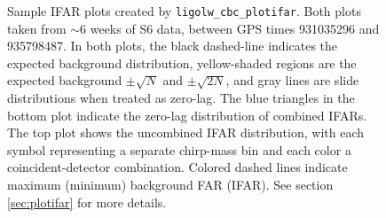 \begin{figure}[p]
\center
{}
\label{fig:sample_plotifar}
\caption{ Sample IFAR plots created by \texttt{ligolw\_cbc\_plotifar}. Both
plots taken from $\sim6$ weeks of \ac{S6} data, between GPS times 931035296 and
935798487.  In both plots, the black dashed-line indicates the expected
background distribution, yellow-shaded regions are the expected background $\pm
\sqrt{N}$ and $\pm \sqrt{2N}$, and gray lines are slide distributions when
treated as zero-lag. The blue triangles in the bottom plot indicate the
zero-lag distribution of combined IFARs. The top plot shows the uncombined IFAR
distribution, with each symbol representing a separate chirp-mass bin and each
color a coincident-detector combination. Colored dashed lines indicate maximum
(minimum) background \ac{FAR} (IFAR). See section \ref{sec:plotifar} for more
details.}
\end{figure}

